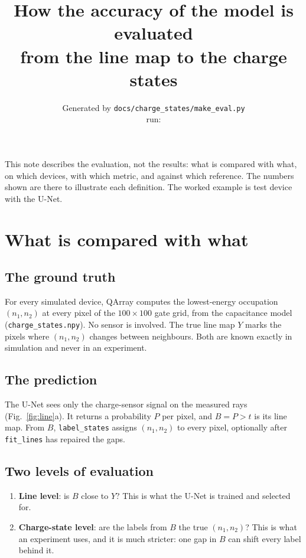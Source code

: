 \documentclass[10pt,a4paper]{article}
\title{How the accuracy of the model is evaluated\\[2pt]
\large from the line map to the charge states}
\author{\small Generated by \texttt{docs/charge\_states/make\_eval.py}\\
\small run: \texttt{\vRun}}
\date{}
\begin{document}
\maketitle

\noindent
This note describes the evaluation, not the results: what is compared with
what, on which devices, with which metric, and against which reference.
The numbers shown are there to illustrate each definition.  The worked
example is test device \vDevice{} with the \vBud{} U-Net.

\section{What is compared with what}

\subsection*{The ground truth}
For every simulated device, QArray computes the lowest-energy occupation
$(n_1,n_2)$ at every pixel of the $100\times100$ gate grid, from the
capacitance model (\texttt{charge\_states.npy}).  No sensor is involved.  The
true line map $Y$ marks the pixels where $(n_1,n_2)$ changes between
neighbours.  Both are known exactly in simulation and never in an
experiment.

\subsection*{The prediction}
The U-Net sees only the charge-sensor signal on the measured rays
(Fig.~\ref{fig:line}a).  It returns a probability $P$ per pixel, and
$B = P > t$ is its line map.  From $B$, \texttt{label\_states} assigns
$(n_1,n_2)$ to every pixel, optionally after \texttt{fit\_lines} has
repaired the gaps.

\subsection*{Two levels of evaluation}
\begin{enumerate}
\item \textbf{Line level}: is $B$ close to $Y$?  This is what the U-Net is
  trained and selected for.
\item \textbf{Charge-state level}: are the labels from $B$ the true
  $(n_1,n_2)$?  This is what an experiment uses, and it is much stricter: one
  gap in $B$ can shift every label behind it.
\end{enumerate}
\end{document}
